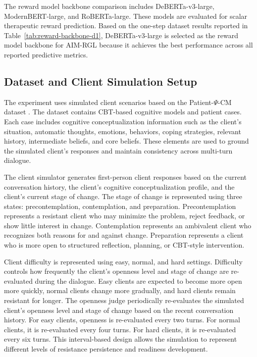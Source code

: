 The reward model backbone comparison includes DeBERTa-v3-large, ModernBERT-large, and RoBERTa-large. These models are evaluated for scalar therapeutic reward prediction. Based on the one-step dataset results reported in Table~\ref{tab:reward-backbone-d1}, DeBERTa-v3-large is selected as the reward model backbone for AIM-RGL because it achieves the best performance across all reported predictive metrics.

\subsection{Dataset and Client Simulation Setup}

The experiment uses simulated client scenarios based on the Patient-\(\Psi\)-CM dataset \cite{wang2024patientpsi}. The dataset contains CBT-based cognitive models and patient cases. Each case includes cognitive conceptualization information such as the client’s situation, automatic thoughts, emotions, behaviors, coping strategies, relevant history, intermediate beliefs, and core beliefs. These elements are used to ground the simulated client’s responses and maintain consistency across multi-turn dialogue.

The client simulator generates first-person client responses based on the current conversation history, the client’s cognitive conceptualization profile, and the client’s current stage of change. The stage of change is represented using three states: precontemplation, contemplation, and preparation. Precontemplation represents a resistant client who may minimize the problem, reject feedback, or show little interest in change. Contemplation represents an ambivalent client who recognizes both reasons for and against change. Preparation represents a client who is more open to structured reflection, planning, or CBT-style intervention.

Client difficulty is represented using easy, normal, and hard settings. Difficulty controls how frequently the client's openness level and stage of change are re-evaluated during the dialogue. Easy clients are expected to become more open more quickly, normal clients change more gradually, and hard clients remain resistant for longer. The openness judge periodically re-evaluates the simulated client's openness level and stage of change based on the recent conversation history. For easy clients, openness is re-evaluated every two turns. For normal clients, it is re-evaluated every four turns. For hard clients, it is re-evaluated every six turns. This interval-based design allows the simulation to represent different levels of resistance persistence and readiness development.

